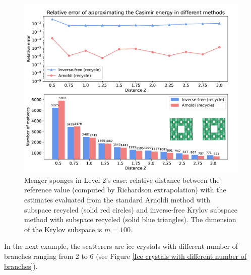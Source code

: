 \begin{figure}[H]
        \centering
        \includegraphics[scale = 1]{figures/level2_rel_err.png}
        \caption{Menger sponges in Level 2's case: relative distance between the reference value (computed by Richardson extrapolation) with the estimates evaluated from the standard Arnoldi 
        method with subspace recycled (solid red circles) and inverse-free Krylov subspace method 
        with subspace recycled (solid blue triangles). The dimension of the Krylov subspace is $m = 100$.}
\end{figure}


In the next example, the scatterers are ice crystals with different number of branches ranging from 2 to 6 (see Figure \ref{Ice crystals with different number of branches}).


